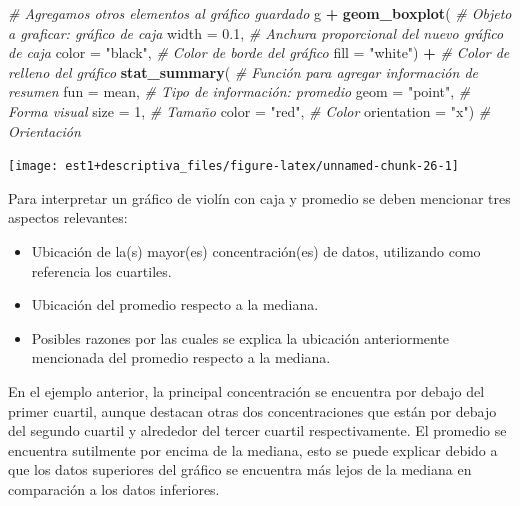 \documentclass[
  11pt,
]{book}
\newenvironment{Shaded}{\begin{snugshade}}{\end{snugshade}}
\newcommand{\AttributeTok}[1]{\textcolor[rgb]{0.13,0.29,0.53}{#1}}
\newcommand{\CommentTok}[1]{\textcolor[rgb]{0.56,0.35,0.01}{\textit{#1}}}
\newcommand{\DecValTok}[1]{\textcolor[rgb]{0.00,0.00,0.81}{#1}}
\newcommand{\FloatTok}[1]{\textcolor[rgb]{0.00,0.00,0.81}{#1}}
\newcommand{\FunctionTok}[1]{\textcolor[rgb]{0.13,0.29,0.53}{\textbf{#1}}}
\newcommand{\NormalTok}[1]{#1}
\newcommand{\SpecialCharTok}[1]{\textcolor[rgb]{0.81,0.36,0.00}{\textbf{#1}}}
\newcommand{\StringTok}[1]{\textcolor[rgb]{0.31,0.60,0.02}{#1}}
\providecommand{\tightlist}{%
  \setlength{\itemsep}{0pt}\setlength{\parskip}{0pt}}
\theoremstyle{definition}
\theoremstyle{definition}
\theoremstyle{definition}
\theoremstyle{definition}
\theoremstyle{remark}
\begin{document}
\begin{Shaded}
\begin{Highlighting}[]
\CommentTok{\# Agregamos otros elementos al gráfico guardado}
\NormalTok{g }\SpecialCharTok{+} \FunctionTok{geom\_boxplot}\NormalTok{( }\CommentTok{\# Objeto a graficar: gráfico de caja}
  \AttributeTok{width =} \FloatTok{0.1}\NormalTok{, }\CommentTok{\# Anchura proporcional del nuevo gráfico de caja}
  \AttributeTok{color =} \StringTok{"black"}\NormalTok{, }\CommentTok{\# Color de borde del gráfico}
  \AttributeTok{fill =} \StringTok{"white"}\NormalTok{) }\SpecialCharTok{+} \CommentTok{\# Color de relleno del gráfico}
  \FunctionTok{stat\_summary}\NormalTok{( }\CommentTok{\# Función para agregar información de resumen}
    \AttributeTok{fun =}\NormalTok{ mean, }\CommentTok{\# Tipo de información: promedio}
    \AttributeTok{geom =} \StringTok{"point"}\NormalTok{, }\CommentTok{\# Forma visual}
    \AttributeTok{size =} \DecValTok{1}\NormalTok{, }\CommentTok{\# Tamaño}
    \AttributeTok{color =} \StringTok{"red"}\NormalTok{, }\CommentTok{\# Color}
    \AttributeTok{orientation =} \StringTok{"x"}\NormalTok{) }\CommentTok{\# Orientación}
\end{Highlighting}
\end{Shaded}

\begin{center}\texttt{[image: est1+descriptiva\_files/figure-latex/unnamed-chunk-26-1]} \end{center}

Para interpretar un gráfico de violín con caja y promedio se deben mencionar tres aspectos relevantes:

\begin{itemize}
\tightlist
\item
  Ubicación de la(s) mayor(es) concentración(es) de datos, utilizando como referencia los cuartiles.
\item
  Ubicación del promedio respecto a la mediana.
\item
  Posibles razones por las cuales se explica la ubicación anteriormente mencionada del promedio respecto a la mediana.
\end{itemize}

En el ejemplo anterior, la principal concentración se encuentra por debajo del primer cuartil, aunque destacan otras dos concentraciones que están por debajo del segundo cuartil y alrededor del tercer cuartil respectivamente. El promedio se encuentra sutilmente por encima de la mediana, esto se puede explicar debido a que los datos superiores del gráfico se encuentra más lejos de la mediana en comparación a los datos inferiores.
\end{document}
